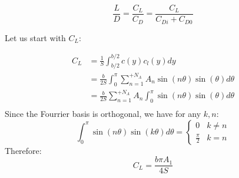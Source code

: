 \documentclass[letterpaper,12pt]{article}
\begin{document}
\begin{equation*}
	\frac L D = \frac{C_L}{C_D} = \frac {C_L} {C_{Di} + C_{D0}} 
\end{equation*}

Let us start with $C_L$:

\begin{align}
	C_L &= \frac 1 S \int_{b/2}^{b/2} c(y) c_l(y) dy  \nonumber \\
		&= \frac b {2S} \int_{0}^{\pi} \sum_{n=1}^{+N_A} A_n \sin(n\theta) \sin(\theta)d\theta \nonumber \\
		&= \frac b {2S}  \sum_{n=1}^{+N_A} A_n \int_{0}^{\pi} \sin(n\theta) \sin(\theta)d\theta \nonumber \\
\end{align}
Since the Fourrier basis is orthogonal, we have for any $k, n$:
\begin{equation*}
	\int_0^{\pi} \sin(n\theta)\sin(k\theta)d\theta = 
	\begin{cases} 
		0 & k \neq n \\
		\frac{\pi}{2} & k = n
	 \end{cases}
\end{equation*}
Therefore:
\begin{equation}
	\label{eq:cl}
	C_L = \frac{b \pi A_1}{4S}
\end{equation}
\end{document}
